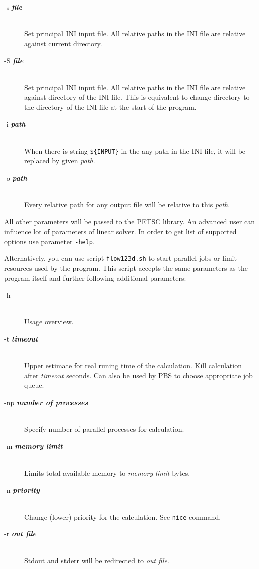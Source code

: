 \documentclass[12pt,a4paper]{report}
\begin{document}
\begin{description}
 \item[-s {\bf\it file}] \hfill\\
 	 Set principal INI input file. All relative paths in the INI file are relative against current directory.
 \item[-S {\bf\it file}] \hfill\\
 	Set principal INI input file. All relative paths in the INI file are relative against directory of the INI file. This is equivalent
to change directory to the directory of the INI file at the start of the program.
 \item[-i {\bf\it path}] \hfill\\
 	When there is string \verb"${INPUT}" %
  	in the any path in the INI file, it will be replaced by given {\it path}.
 \item[-o {\bf\it path}] \hfill\\
 	Every relative path for any output file will be relative to this {\it path}. 
\end{description}

All other parameters will be passed to the PETSC library. An advanced user can influence lot of parameters of linear solver. In order to get list of supported options 
use parameter \verb'-help'.


Alternatively, you can use script \verb'flow123d.sh' to start parallel jobs or limit resources used by the program. This script accepts the same parameters as the program itself
and further following additional parameters:

\begin{description}
  \item[-h] \hfill\\
  	Usage overview.
  \item[-t {\bf\it timeout}] \hfill\\
  	Upper estimate for real runing time of the calculation. Kill calculation after {\it timeout} seconds. 
  	Can also be used by PBS to choose appropriate job queue. 
  \item[-np {\bf\it number of processes}] \hfill\\
  	Specify number of parallel processes for calculation.
  \item[-m {\bf\it memory limit}] \hfill\\
  	Limits total available memory to {\it memory limit} bytes.
  \item[-n {\bf\it priority}] \hfill\\
  	Change (lower) priority for the calculation. See {\tt nice} command.
  \item[-r {\bf\it out file}] \hfill\\
  	Stdout and stderr will be redirected to {\it out file}.
\end{description}
\end{document}

